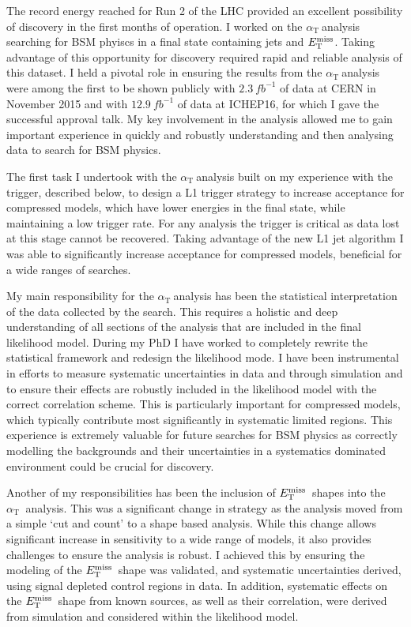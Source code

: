\documentclass[11pt]{article}
\theoremstyle{plain} \numberwithin{equation}{section}
\theoremstyle{definition}
\DeclareRobustCommand{\alphat}{$\alpha_{\text{T}}~$}
\DeclareRobustCommand{\met}{$\mbox{$E_\text{T}^{\rm miss}$}\xspace$}
\newcounter{list}
\begin{document}
The record energy reached for Run 2 of the LHC provided an excellent possibility of discovery
in the first months of operation. I worked on the \alphat analysis searching
for BSM phyiscs in a final state containing jets and \met. 
Taking advantage of this opportunity for discovery required rapid and reliable analysis of this dataset. 
I held a pivotal role in ensuring the results from the \alphat analysis were among the 
first to be shown publicly with $2.3~{fb}^{-1}$ of data at CERN in November 2015
and with $12.9~{fb}^{-1}$ of data at ICHEP16, for which I gave the successful
approval talk. My key involvement in the analysis allowed me to gain important experience 
in quickly and robustly understanding and then analysing data to search for BSM physics. 

The first task I undertook with the \alphat analysis built on my experience with the 
trigger, described below, to design a L1 trigger strategy to increase acceptance for compressed models,
which have lower energies in the final state, while maintaining a low trigger rate. 
For any analysis the trigger is critical as data lost at this stage cannot be recovered. 
Taking advantage of the new L1 jet algorithm I was able to significantly increase 
acceptance for compressed models, beneficial for a wide ranges of searches.

My main responsibility for the \alphat analysis has been the statistical interpretation
of the data collected by the search. This requires a holistic and deep understanding
of all sections of the analysis that are included in the final likelihood model. During my
PhD I have worked to completely rewrite the statistical framework and redesign the likelihood mode. 
I have been instrumental in efforts to measure systematic uncertainties in data and through simulation and to
ensure their effects are robustly included in the likelihood 
model with the correct correlation scheme. This is particularly important for compressed models, which typically
contribute most significantly in systematic limited regions. This experience is extremely valuable 
for future searches for BSM physics as correctly modelling the backgrounds and their uncertainties in a systematics 
dominated environment could be crucial for discovery.

Another of my responsibilities has been the inclusion of \met~shapes into the \alphat
analysis. This was a significant change in strategy as the analysis moved from a simple `cut and
count' to a shape based analysis. While this change allows significant increase in sensitivity to a wide 
range of models, it also provides challenges to ensure the analysis is robust. I achieved this
by ensuring the modeling of the \met~shape was validated, and systematic uncertainties derived, 
using signal depleted control regions in data. In addition, systematic effects on the \met~shape from known sources,
as well as their correlation, were derived from simulation and considered within the likelihood model.
\end{document}
